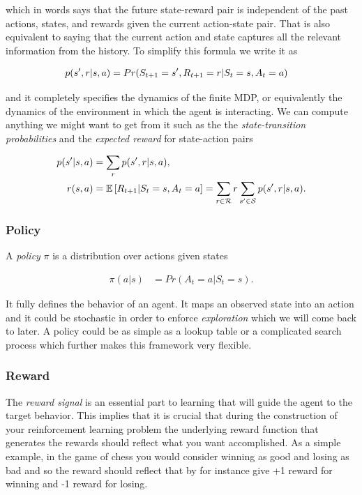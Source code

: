 \documentclass[result.tex]{subfiles}
\begin{document}
    which in words says that the future state-reward pair is independent of the past actions, states, and rewards given the current action-state pair. That is also equivalent to saying that the current action and state captures all the relevant information from the history. To simplify this formula we write it as

    \begin{align*}
        p(s^\prime, r | s, a) &=
        Pr(S_{t + 1} = s^\prime, R_{t + 1} = r | S_t = s, A_t = a)
    \end{align*}

    and it completely specifies the dynamics of the finite MDP, or equivalently the dynamics of the environment in which the agent is interacting. We can compute anything we might want to get from it such as the the \textit{state-transition probabilities} and the \textit{expected reward} for state-action pairs

    \begin{align*}
        p(s^\prime | s, a) &=
        \sum_r p(s^\prime, r | s, a), \\
        r(s, a) &=
        \mathbb{E} \left[ R_{t + 1} | S_t = s, A_t = a \right] =
        \sum_{r \in \mathcal{R}} r \sum_{s^\prime \in \mathcal{S}} p(s^\prime, r | s, a).
    \end{align*}

    \subsubsection*{Policy}

    A \textit{policy} $\pi$ is a distribution over actions given states

    \begin{align*}
        \pi(a | s) &= Pr(A_t = a | S_t = s).
    \end{align*}

    It fully defines the behavior of an agent. It maps an observed state into an action and it could be stochastic in order to enforce \textit{exploration} which we will come back to later. A policy could be as simple as a lookup table or a complicated search process which further makes this framework very flexible.

    \subsubsection*{Reward}

    The \textit{reward signal} is an essential part to learning that will guide the agent to the target behavior. This implies that it is crucial that during the construction of your reinforcement learning problem the underlying reward function that generates the rewards should reflect what you want accomplished. As a simple example, in the game of chess you would consider winning as good and losing as bad and so the reward should reflect that by for instance give +1 reward for winning and -1 reward for losing.
\end{document}
